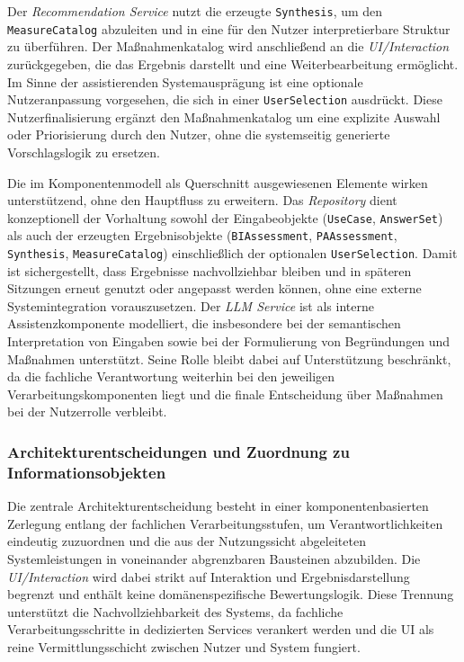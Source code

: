 Der \textit{Recommendation Service} nutzt die erzeugte \texttt{Synthesis}, um den \texttt{MeasureCatalog} abzuleiten und in eine für den Nutzer interpretierbare Struktur zu überführen. Der Maßnahmenkatalog wird anschließend an die \textit{UI/Interaction} zurückgegeben, die das Ergebnis darstellt und eine Weiterbearbeitung ermöglicht. Im Sinne der assistierenden Systemausprägung ist eine optionale Nutzeranpassung vorgesehen, die sich in einer \texttt{UserSelection} ausdrückt. Diese Nutzerfinalisierung ergänzt den Maßnahmenkatalog um eine explizite Auswahl oder Priorisierung durch den Nutzer, ohne die systemseitig generierte Vorschlagslogik zu ersetzen.

Die im Komponentenmodell als Querschnitt ausgewiesenen Elemente wirken unterstützend, ohne den Hauptfluss zu erweitern. Das \textit{Repository} dient konzeptionell der Vorhaltung sowohl der Eingabeobjekte (\texttt{UseCase}, \texttt{AnswerSet}) als auch der erzeugten Ergebnisobjekte (\texttt{BIAssessment}, \texttt{PAAssessment}, \texttt{Synthesis}, \texttt{MeasureCatalog}) einschließlich der optionalen \texttt{UserSelection}. Damit ist sichergestellt, dass Ergebnisse nachvollziehbar bleiben und in späteren Sitzungen erneut genutzt oder angepasst werden können, ohne eine externe Systemintegration vorauszusetzen. Der \textit{LLM Service} ist als interne Assistenzkomponente modelliert, die insbesondere bei der semantischen Interpretation von Eingaben sowie bei der Formulierung von Begründungen und Maßnahmen unterstützt. Seine Rolle bleibt dabei auf Unterstützung beschränkt, da die fachliche Verantwortung weiterhin bei den jeweiligen Verarbeitungskomponenten liegt und die finale Entscheidung über Maßnahmen bei der Nutzerrolle verbleibt.


\subsubsection{Architekturentscheidungen und Zuordnung zu Informationsobjekten}
Die zentrale Architekturentscheidung besteht in einer komponentenbasierten Zerlegung entlang der fachlichen Verarbeitungsstufen, um Verantwortlichkeiten eindeutig zuzuordnen und die aus der Nutzungssicht abgeleiteten Systemleistungen in voneinander abgrenzbaren Bausteinen abzubilden. Die \textit{UI/Interaction} wird dabei strikt auf Interaktion und Ergebnisdarstellung begrenzt und enthält keine domänenspezifische Bewertungslogik. Diese Trennung unterstützt die Nachvollziehbarkeit des Systems, da fachliche Verarbeitungsschritte in dedizierten Services verankert werden und die UI als reine Vermittlungsschicht zwischen Nutzer und System fungiert.

